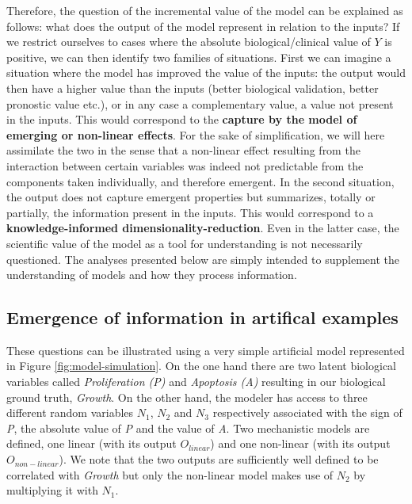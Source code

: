 \documentclass[a4paper,12pt,twoside,onecolumn,openright,final,oldfontcommands]{memoir}
\begin{document}
Therefore, the question of the incremental value of the model can be
explained as follows: what does the output of the model represent in
relation to the inputs? If we restrict ourselves to cases where the
absolute biological/clinical value of \(Y\) is positive, we can then
identify two families of situations. First we can imagine a situation
where the model has improved the value of the inputs: the output would
then have a higher value than the inputs (better biological validation,
better pronostic value etc.), or in any case a complementary value, a
value not present in the inputs. This would correspond to the
\textbf{capture by the model of emerging or non-linear effects}. For the
sake of simplification, we will here assimilate the two in the sense
that a non-linear effect resulting from the interaction between certain
variables was indeed not predictable from the components taken
individually, and therefore emergent. In the second situation, the
output does not capture emergent properties but summarizes, totally or
partially, the information present in the inputs. This would correspond
to a \textbf{knowledge-informed dimensionality-reduction}. Even in the
latter case, the scientific value of the model as a tool for
understanding is not necessarily questioned. The analyses presented
below are simply intended to supplement the understanding of models and
how they process information.

\subsection{Emergence of information in artifical
examples}\label{emergence-of-information-in-artifical-examples}

These questions can be illustrated using a very simple artificial model
represented in Figure \ref{fig:model-simulation}. On the one hand there
are two latent biological variables called \emph{Proliferation (P)} and
\emph{Apoptosis (A)} resulting in our biological ground truth,
\emph{Growth}. On the other hand, the modeler has access to three
different random variables \(N_1\), \(N_2\) and \(N_3\) respectively
associated with the sign of \emph{P}, the absolute value of \emph{P} and
the value of \emph{A}. Two mechanistic models are defined, one linear
(with its output \(O_{linear}\)) and one non-linear (with its output
\(O_{non-linear}\)). We note that the two outputs are sufficiently well
defined to be correlated with \emph{Growth} but only the non-linear
model makes use of \(N_2\) by multiplying it with \(N_1\).
\end{document}
